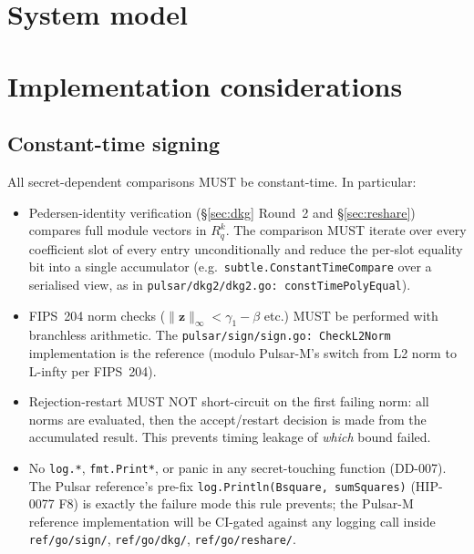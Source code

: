 \documentclass[11pt,a4paper]{article}
\theoremstyle{definition}
\theoremstyle{remark}
\newcommand{\Rq}{R_q}
\begin{document}
\section{System model}
\label{sec:system-model}



\section{Implementation considerations}
\label{sec:impl}

\subsection{Constant-time signing}
\label{sec:impl-ct}

All secret-dependent comparisons MUST be constant-time. In
particular:

\begin{itemize}[leftmargin=*, itemsep=0pt]
\item Pedersen-identity verification (\S\ref{sec:dkg} Round~2 and
\S\ref{sec:reshare}) compares full module vectors in $\Rq^k$. The
comparison MUST iterate over every coefficient slot of every entry
unconditionally and reduce the per-slot equality bit into a single
accumulator (e.g.\ \texttt{subtle.ConstantTimeCompare} over a
serialised view, as in
\texttt{pulsar/dkg2/dkg2.go: constTimePolyEqual}).
\item FIPS~204 norm checks ($\|\mathbf{z}\|_\infty < \gamma_1 - \beta$
etc.) MUST be performed with branchless arithmetic. The
\texttt{pulsar/sign/sign.go: CheckL2Norm} implementation is the
reference (modulo Pulsar-M's switch from L2 norm to L-infty per
FIPS~204).
\item Rejection-restart MUST NOT short-circuit on the first failing
norm: all norms are evaluated, then the accept/restart decision is
made from the accumulated result. This prevents timing leakage of
\emph{which} bound failed.
\item No \texttt{log.*}, \texttt{fmt.Print*}, or panic in any
secret-touching function (DD-007). The Pulsar reference's
pre-fix \texttt{log.Println(Bsquare, sumSquares)} (HIP-0077 F8) is
exactly the failure mode this rule prevents; the Pulsar-M reference
implementation will be CI-gated against any logging call inside
\texttt{ref/go/sign/}, \texttt{ref/go/dkg/}, \texttt{ref/go/reshare/}.
\end{itemize}
\end{document}
